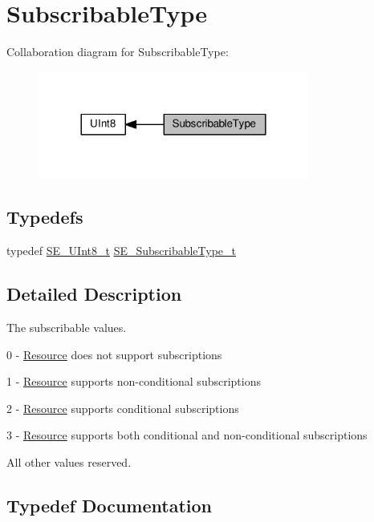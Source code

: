 \hypertarget{group__SubscribableType}{}\section{Subscribable\+Type}
\label{group__SubscribableType}
Collaboration diagram for Subscribable\+Type\+:\nopagebreak
\begin{figure}[H]
\begin{center}
\leavevmode
\includegraphics[width=252pt]{group__SubscribableType}
\end{center}
\end{figure}
\subsection*{Typedefs}
\begin{DoxyCompactItemize}
\item 
typedef \hyperlink{group__UInt8_gaf7c365a1acfe204e3a67c16ed44572f5}{S\+E\+\_\+\+U\+Int8\+\_\+t} \hyperlink{group__SubscribableType_ga5c41f553d369710ed34619266bf2551e}{S\+E\+\_\+\+Subscribable\+Type\+\_\+t}
\end{DoxyCompactItemize}


\subsection{Detailed Description}
The subscribable values.

0 -\/ \hyperlink{structResource}{Resource} does not support subscriptions

1 -\/ \hyperlink{structResource}{Resource} supports non-\/conditional subscriptions

2 -\/ \hyperlink{structResource}{Resource} supports conditional subscriptions

3 -\/ \hyperlink{structResource}{Resource} supports both conditional and non-\/conditional subscriptions

All other values reserved. 

\subsection{Typedef Documentation}
\mbox{\label{group__SubscribableType_ga5c41f553d369710ed34619266bf2551e}} 
